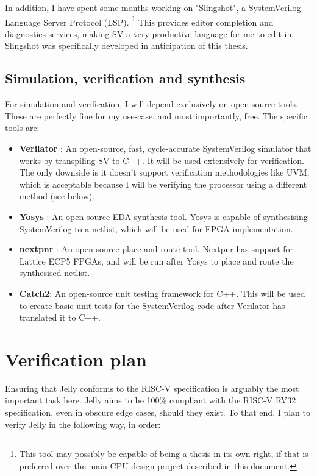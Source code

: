 \documentclass{article}
\begin{document}
In addition, I have spent some months working on "Slingshot", a SystemVerilog Language Server Protocol 
(LSP). \footnote{This tool may possibly be capable of being a thesis in its own right, if that is preferred
over the main CPU design project described in this document.}
This provides editor completion and diagnostics services, making SV a very productive language for
me to edit in. Slingshot was specifically developed in anticipation of this thesis.

\subsection{Simulation, verification and synthesis}
For simulation and verification, I will depend exclusively on open source tools. These are perfectly fine for
my use-case, and most importantly, free. The specific tools are:
\begin{itemize}
	\item \textbf{Verilator} \cite{verilator}: An open-source, fast, cycle-accurate SystemVerilog simulator that works by 
		transpiling SV to C++. It will be used extensively for verification. The only downside is it 
		doesn't support verification methodologies like UVM, which is acceptable because I will be 
		verifying the processor using a different method (see below).
	\item \textbf{Yosys} \cite{shah2019yosysnextpnr}: An open-source EDA synthesis tool. Yosys is capable of synthesising SystemVerilog 
		to a netlist, which will be used for FPGA implementation.
	\item \textbf{nextpnr} \cite{shah2019yosysnextpnr}: An open-source place and route tool. Nextpnr has support for Lattice ECP5 
		FPGAs, and will be run after Yosys to place and route the synthesised netlist.
	\item \textbf{Catch2}: An open-source unit testing framework for C++. This will be used to create 
		basic unit tests for the SystemVerilog code after Verilator has translated it to C++.
\end{itemize}

\section{Verification plan}
Ensuring that Jelly conforms to the RISC-V specification is arguably the most important task here. Jelly aims
to be 100\% compliant with the RISC-V RV32 specification, even in obscure edge cases, should they exist.
To that end, I plan to verify Jelly in the following way, in order:
\end{document}
